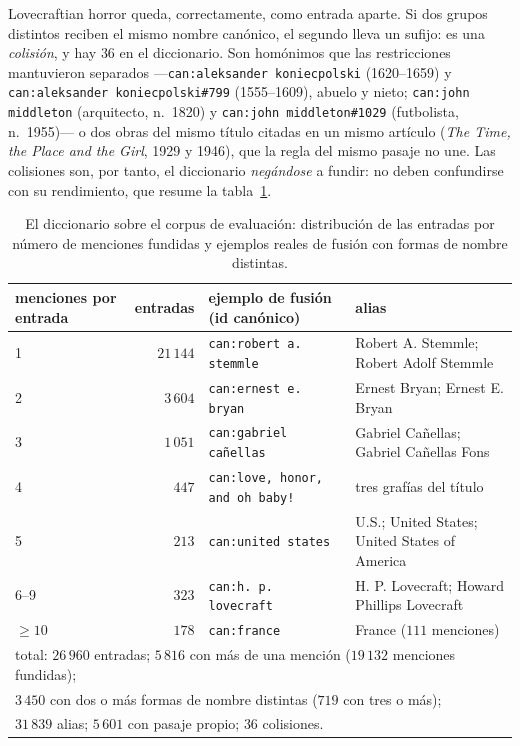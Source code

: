 \documentclass[11pt,a4paper]{article}
\begin{document}
\guillemotleft{}Lovecraftian horror\guillemotright{} queda, correctamente, como entrada aparte. Si dos
grupos distintos reciben el mismo nombre canónico, el segundo lleva un
sufijo: es una \emph{colisión}, y hay $36$ en el diccionario. Son homónimos
que las restricciones mantuvieron separados ---\texttt{can:aleksander
koniecpolski} (1620--1659) y \texttt{can:aleksander koniecpolski\#799}
(1555--1609), abuelo y nieto; \texttt{can:john middleton} (arquitecto,
n.~1820) y \texttt{can:john middleton\#1029} (futbolista, n.~1955)--- o dos
obras del mismo título citadas en un mismo artículo (\emph{The Time, the
Place and the Girl}, 1929 y 1946), que la regla del mismo pasaje no une.
Las colisiones son, por tanto, el diccionario \emph{negándose} a fundir:
no deben confundirse con su rendimiento, que resume la
tabla~\ref{tab:dicc-cifras}.

\begin{table}[t]
\centering\footnotesize\setlength{\tabcolsep}{5pt}
\caption{El diccionario sobre el corpus de evaluación: distribución de las
entradas por número de menciones fundidas y ejemplos reales de fusión con
formas de nombre distintas.}
\label{tab:dicc-cifras}
\begin{tabular}{lr@{\quad}l>{\raggedright\arraybackslash}p{}}
\toprule
menciones por entrada & entradas & ejemplo de fusión (id canónico) & alias\\
\midrule
1 & $21\,144$ & \texttt{can:robert a. stemmle} & Robert A. Stemmle; Robert Adolf Stemmle\\
2 & $3\,604$ & \texttt{can:ernest e. bryan} & Ernest Bryan; Ernest E. Bryan\\
3 & $1\,051$ & \texttt{can:gabriel cañellas} & Gabriel Cañellas; Gabriel Cañellas Fons\\
4 & $447$ & \texttt{can:love, honor, and oh baby!} & tres grafías del título\\
5 & $213$ & \texttt{can:united states} & U.S.; United States; United States of America\\
6--9 & $323$ & \texttt{can:h. p. lovecraft} & H. P. Lovecraft; Howard Phillips Lovecraft\\
$\ge 10$ & $178$ & \texttt{can:france} & France ($111$ menciones)\\
\midrule
\multicolumn{4}{l}{total: $26\,960$ entradas; $5\,816$ con más de una mención ($19\,132$ menciones fundidas);}\\
\multicolumn{4}{l}{$3\,450$ con dos o más formas de nombre distintas ($719$ con tres o más);}\\
\multicolumn{4}{l}{$31\,839$ alias; $5\,601$ con pasaje propio; $36$ colisiones.}\\
\bottomrule
\end{tabular}
\end{table}
\end{document}
